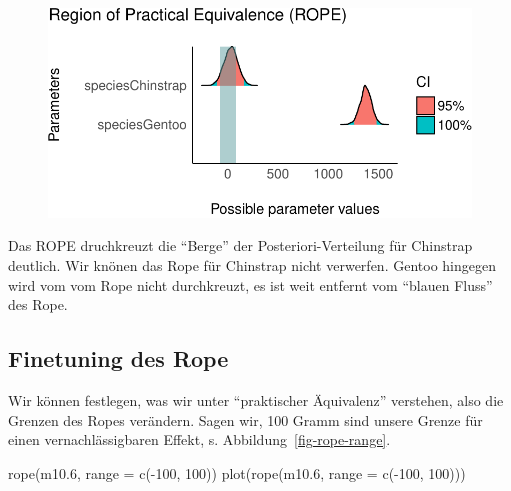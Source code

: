 \documentclass[
  a4paper,
  DIV=11]{scrreprt}
\newenvironment{Shaded}{\begin{snugshade}}{\end{snugshade}}
\newcommand{\AttributeTok}[1]{\textcolor[rgb]{0.40,0.45,0.13}{#1}}
\newcommand{\DecValTok}[1]{\textcolor[rgb]{0.68,0.00,0.00}{#1}}
\newcommand{\FloatTok}[1]{\textcolor[rgb]{0.68,0.00,0.00}{#1}}
\newcommand{\FunctionTok}[1]{\textcolor[rgb]{0.28,0.35,0.67}{#1}}
\newcommand{\NormalTok}[1]{\textcolor[rgb]{0.00,0.23,0.31}{#1}}
\newcommand{\SpecialCharTok}[1]{\textcolor[rgb]{0.37,0.37,0.37}{#1}}
\theoremstyle{definition}
\theoremstyle{remark}
\begin{document}
\begin{figure}[H]

{\centering \includegraphics{./metrische-AV_files/figure-pdf/unnamed-chunk-36-1.pdf}

}

\end{figure}

Das ROPE druchkreuzt die ``Berge'' der Posteriori-Verteilung für
Chinstrap deutlich. Wir knönen das Rope für Chinstrap nicht verwerfen.
Gentoo hingegen wird vom vom Rope nicht durchkreuzt, es ist weit
entfernt vom ``blauen Fluss'' des Rope.

\hypertarget{finetuning-des-rope}{%
\subsection{Finetuning des Rope}\label{finetuning-des-rope}}

Wir können festlegen, was wir unter ``praktischer Äquivalenz''
verstehen, also die Grenzen des Ropes verändern. Sagen wir, 100 Gramm
sind unsere Grenze für einen vernachlässigbaren Effekt, s.
Abbildung~\ref{fig-rope-range}.

\begin{Shaded}
\begin{Highlighting}[]
\FunctionTok{rope}\NormalTok{(m10}\FloatTok{.6}\NormalTok{, }\AttributeTok{range =} \FunctionTok{c}\NormalTok{(}\SpecialCharTok{{-}}\DecValTok{100}\NormalTok{, }\DecValTok{100}\NormalTok{))}
\FunctionTok{plot}\NormalTok{(}\FunctionTok{rope}\NormalTok{(m10}\FloatTok{.6}\NormalTok{, }\AttributeTok{range =} \FunctionTok{c}\NormalTok{(}\SpecialCharTok{{-}}\DecValTok{100}\NormalTok{, }\DecValTok{100}\NormalTok{)))}
\end{Highlighting}
\end{Shaded}
\end{document}
